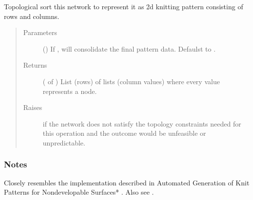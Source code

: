 \documentclass[letterpaper,10pt,english]{sphinxmanual}
\begin{document}
\begin{fulllineitems}
\begin{fulllineitems}
\label{\detokenize{cockatoo:cockatoo.KnitDiNetwork.make_pattern_data}}
Topological sort this network to represent it as 2d knitting pattern
consisting of rows and columns.
\begin{quote}\begin{description}
\item[{Parameters}] \leavevmode
{} () \textendash{} If , will consolidate the final pattern data.
Defaulst to .

\item[{Returns}] \leavevmode
{} ( of ) \textendash{} List (rows) of lists (column values) where every value represents
a node.

\item[{Raises}] \leavevmode
{\hyperref[\detokenize{cockatoo:cockatoo.exception.KnitNetworkTopologyError}]{}} \textendash{} if the network does not satisfy the topology constraints needed for
    this operation and the outcome would be unfeasible or unpredictable.

\end{description}\end{quote}
\subsubsection*{Notes}

Closely resembles the implementation described in Automated Generation
of Knit Patterns for Non\sphinxhyphen{}developable Surfaces* \sphinxfootnotemark[1]. Also see  \sphinxfootnotemark[2].

\end{fulllineitems}



\end{fulllineitems}
\end{document}

